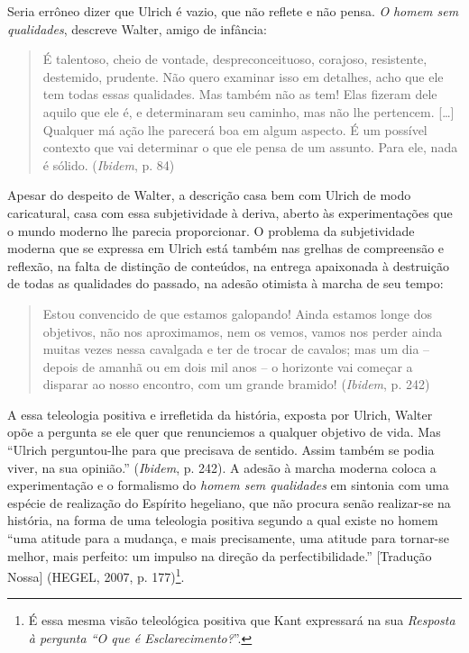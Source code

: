 Seria errôneo dizer que Ulrich é vazio, que não reflete e não pensa.
\emph{O} \emph{homem sem qualidades}, descreve Walter, amigo de
infância:

\begin{quote}
É talentoso, cheio de vontade, despreconceituoso, corajoso, resistente,
destemido, prudente. Não quero examinar isso em detalhes, acho que ele
tem todas essas qualidades. Mas também não as tem! Elas fizeram dele
aquilo que ele é, e determinaram seu caminho, mas não lhe pertencem.
{[}\ldots{}{]} Qualquer má ação lhe parecerá boa em algum aspecto. É um
possível contexto que vai determinar o que ele pensa de um assunto. Para
ele, nada é sólido. (\emph{Ibidem}, p. 84)
\end{quote}

Apesar do despeito de Walter, a descrição casa bem com Ulrich de modo
caricatural, casa com essa subjetividade à deriva, aberto às
experimentações que o mundo moderno lhe parecia proporcionar. O problema
da subjetividade moderna que se expressa em Ulrich está também nas
grelhas de compreensão e reflexão, na falta de distinção de conteúdos,
na entrega apaixonada à destruição de todas as qualidades do passado, na
adesão otimista à marcha de seu tempo:

\begin{quote}
Estou convencido de que estamos galopando! Ainda estamos longe dos
objetivos, não nos aproximamos, nem os vemos, vamos nos perder ainda
muitas vezes nessa cavalgada e ter de trocar de cavalos; mas um dia --
depois de amanhã ou em dois mil anos -- o horizonte vai começar a
disparar ao nosso encontro, com um grande bramido! (\emph{Ibidem}, p.
242)
\end{quote}

A essa teleologia positiva e irrefletida da história, exposta por
Ulrich, Walter opõe a pergunta se ele quer que renunciemos a qualquer
objetivo de vida. Mas ``Ulrich perguntou-lhe para que precisava de
sentido. Assim também se podia viver, na sua opinião.'' (\emph{Ibidem},
p. 242). A adesão à marcha moderna coloca a experimentação e o
formalismo do \emph{homem sem qualidades} em sintonia com uma espécie de
realização do Espírito hegeliano, que não procura senão realizar-se na
história, na forma de uma teleologia positiva segundo a qual existe no
homem ``uma atitude para a mudança, e mais precisamente, uma atitude
para tornar-se melhor, mais perfeito: um impulso na direção da
perfectibilidade.'' {[}Tradução Nossa{]} (HEGEL, 2007, p. 177)\footnote{É
  essa mesma visão teleológica positiva que Kant expressará na sua
  \emph{Resposta à pergunta ``O que é Esclarecimento?}''.}.

